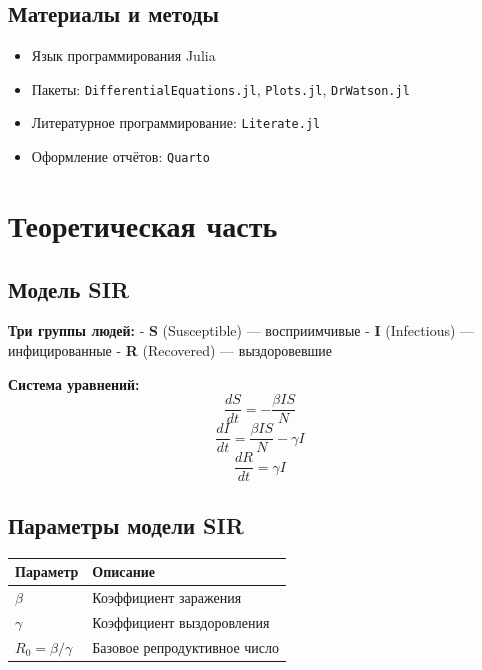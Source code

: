 \documentclass[
  letterpaper,
  DIV=11,
  numbers=noendperiod]{scrartcl}
\providecommand{\tightlist}{%
  \setlength{\itemsep}{0pt}\setlength{\parskip}{0pt}}\usepackage{longtable,booktabs,array}
\begin{document}
\subsection{Материалы и
методы}\label{ux43cux430ux442ux435ux440ux438ux430ux43bux44b-ux438-ux43cux435ux442ux43eux434ux44b}

\begin{itemize}
\tightlist
\item
  Язык программирования Julia
\item
  Пакеты: \texttt{DifferentialEquations.jl}, \texttt{Plots.jl},
  \texttt{DrWatson.jl}
\item
  Литературное программирование: \texttt{Literate.jl}
\item
  Оформление отчётов: \texttt{Quarto}
\end{itemize}

\section{Теоретическая
часть}\label{ux442ux435ux43eux440ux435ux442ux438ux447ux435ux441ux43aux430ux44f-ux447ux430ux441ux442ux44c}

\subsection{Модель SIR}\label{ux43cux43eux434ux435ux43bux44c-sir}

\textbf{Три группы людей:} - \textbf{S} (Susceptible) --- восприимчивые
- \textbf{I} (Infectious) --- инфицированные - \textbf{R} (Recovered)
--- выздоровевшие

\textbf{Система уравнений:} \[ \frac{dS}{dt} = -\frac{\beta I S}{N} \]
\[ \frac{dI}{dt} = \frac{\beta I S}{N} - \gamma I \]
\[ \frac{dR}{dt} = \gamma I \]

\subsection{Параметры модели
SIR}\label{ux43fux430ux440ux430ux43cux435ux442ux440ux44b-ux43cux43eux434ux435ux43bux438-sir}

\begin{longtable}[]{@{}ll@{}}
\toprule\noalign{}
Параметр & Описание \\
\midrule\noalign{}
\endhead
\bottomrule\noalign{}
\endlastfoot
\(\beta\) & Коэффициент заражения \\
\(\gamma\) & Коэффициент выздоровления \\
\(R_0 = \beta/\gamma\) & Базовое репродуктивное число \\
\end{longtable}
\end{document}
